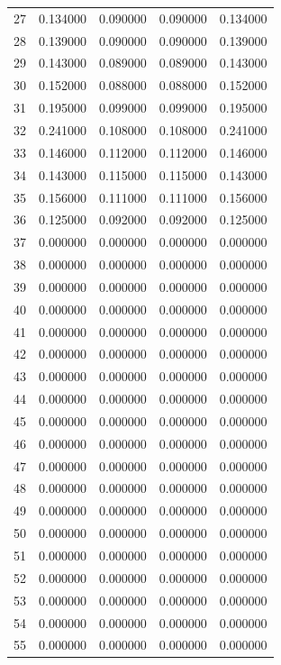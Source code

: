 \begin{tabular}{lrrrr}
27 & 0.134000 & 0.090000 & 0.090000 & 0.134000 \\
28 & 0.139000 & 0.090000 & 0.090000 & 0.139000 \\
29 & 0.143000 & 0.089000 & 0.089000 & 0.143000 \\
30 & 0.152000 & 0.088000 & 0.088000 & 0.152000 \\
31 & 0.195000 & 0.099000 & 0.099000 & 0.195000 \\
32 & 0.241000 & 0.108000 & 0.108000 & 0.241000 \\
33 & 0.146000 & 0.112000 & 0.112000 & 0.146000 \\
34 & 0.143000 & 0.115000 & 0.115000 & 0.143000 \\
35 & 0.156000 & 0.111000 & 0.111000 & 0.156000 \\
36 & 0.125000 & 0.092000 & 0.092000 & 0.125000 \\
37 & 0.000000 & 0.000000 & 0.000000 & 0.000000 \\
38 & 0.000000 & 0.000000 & 0.000000 & 0.000000 \\
39 & 0.000000 & 0.000000 & 0.000000 & 0.000000 \\
40 & 0.000000 & 0.000000 & 0.000000 & 0.000000 \\
41 & 0.000000 & 0.000000 & 0.000000 & 0.000000 \\
42 & 0.000000 & 0.000000 & 0.000000 & 0.000000 \\
43 & 0.000000 & 0.000000 & 0.000000 & 0.000000 \\
44 & 0.000000 & 0.000000 & 0.000000 & 0.000000 \\
45 & 0.000000 & 0.000000 & 0.000000 & 0.000000 \\
46 & 0.000000 & 0.000000 & 0.000000 & 0.000000 \\
47 & 0.000000 & 0.000000 & 0.000000 & 0.000000 \\
48 & 0.000000 & 0.000000 & 0.000000 & 0.000000 \\
49 & 0.000000 & 0.000000 & 0.000000 & 0.000000 \\
50 & 0.000000 & 0.000000 & 0.000000 & 0.000000 \\
51 & 0.000000 & 0.000000 & 0.000000 & 0.000000 \\
52 & 0.000000 & 0.000000 & 0.000000 & 0.000000 \\
53 & 0.000000 & 0.000000 & 0.000000 & 0.000000 \\
54 & 0.000000 & 0.000000 & 0.000000 & 0.000000 \\
55 & 0.000000 & 0.000000 & 0.000000 & 0.000000 \\

\end{tabular}
